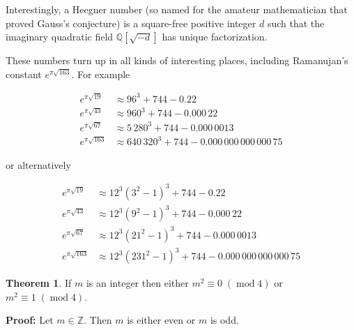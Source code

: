 \documentclass[11pt, oneside]{article}   	%
\theoremstyle{definition}
\newtheorem{thm}{Theorem}[section]
\DeclareMathOperator{\mymod}{\text{mod}}
\begin{document}
\bigskip
\noindent
Interestingly,  a Heegner number (so named for the amateur mathematician that proved Gauss's conjecture) is a square-free positive integer $d$ 
such that the imaginary quadratic field $\mathbb {Q} [\sqrt {-d}]$  has unique factorization.

\bigskip
\noindent
These numbers turn up in all kinds of interesting places, including Ramanujan's constant $e^{{\pi {\sqrt {163}}}}$.  For example


\begin{center}
\begin{equation*}
\begin{array}{llll} 
e^{{\pi {\sqrt  {19}}}}   &\approx  96^{3} + 744 - 0.22 \\
e^{{\pi {\sqrt  {43}}}}   &\approx 960^{3}+744-0.000\,22\\
e^{{\pi {\sqrt  {67}}}}   &\approx 5\,280^{3}+744-0.000\,0013\\
e^{{\pi {\sqrt  {163}}}} &\approx 640\,320^{3}+744-0.000\,000\,000\,000\,75
\end{array}
\end{equation*}
\end{center}

\noindent
or alternatively

\begin{equation*}
\begin{array}{llll} 
e^{{\pi {\sqrt  {19}}}}   &\approx 12^{3}(3^{2}-1)^{3}+744-0.22    \\
e^{{\pi {\sqrt  {43}}}}   &\approx 12^{3}(9^{2}-1)^{3}+744-0.000\,22\\
e^{{\pi {\sqrt  {67}}}}   &\approx 12^{3}(21^{2}-1)^{3}+744-0.000\,0013\\
e^{{\pi {\sqrt  {163}}}} &\approx 12^{3}(231^{2}-1)^{3}+744-0.000\,000\,000\,000\,75
\end{array}
\end{equation*}


\bigskip
\begin{thm}
If $m$ is an integer then either $m^2 \equiv 0 \; (\mymod 4)$ or $m^2 \equiv 1 \; (\mymod 4)$.
\end{thm}

\bigskip
\noindent \textbf{Proof:} Let $m \in \mathbb{Z}$. Then $m$ is either even or $m$ is odd.
\end{document}
